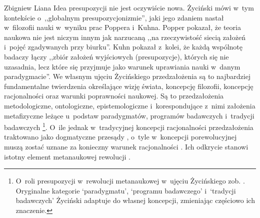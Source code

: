 \begin{artplenv}{Zbigniew Liana}
Idea presupozycji nie jest oczywiście nowa. Życiński
\parencite*[][s.~311n]{zycinski_granice_1993} %
 mówi w~tym kontekście o~,,globalnym presupozycjonizmie'', jaki jego zdaniem nastał w~filozofii nauki w~wyniku prac Poppera i~Kuhna. Popper pokazał, że teoria naukowa nie jest niczym innym jak narzucaną ,,na rzeczywistość siecią założeń i~pojęć zgadywanych przy biurku''. Kuhn pokazał z~kolei, że każdą wspólnotę badaczy łączy ,,zbiór założeń wyjściowych (presupozycje), których się nie uzasadnia, lecz które się przyjmuje jako warunek uprawiania nauki w~danym paradygmacie''. We własnym ujęciu Życińskiego przedzałożenia są to najbardziej fundamentalne twierdzenia określające wizję świata, koncepcję filozofii, koncepcję racjonalności oraz warunki poprawności naukowej. Są to przedzałożenia metodologiczne, ontologiczne, epistemologiczne i~korespondujące z~nimi założenia metafizyczne leżące u~podstaw paradygmatów, programów badawczych i~tradycji badawczych 
\parencites[][s.~7.133]{zycinski_teizm_1985}[][s.~21n.143]{zycinski_structure_1988}[][s.~37nn.253]{zycinski_struktura_2013_liana}%
\footnote{O~roli presupozycji w~rewolucji metanaukowej w~ujęciu Życińskiego zob. 
\parencite[][s.~173–177]{liana_nauka_2019_liana}. %
 Oryginalne kategorie ‘paradygmatu', ‘programu badawczego' i~‘tradycji badawczych' Życiński adaptuje do własnej koncepcji, zmieniając częściowo ich znaczenie.}. O~ile jednak w~tradycyjnej koncepcji racjonalności przedzałożenia traktowano jako dogmatyczne przesądy 
\parencite[][s.~169n]{zycinski_teizm_1985}, %
 o~tyle w~koncepcji porewolucyjnej muszą zostać uznane za konieczny warunek racjonalności 
\parencite[][s.~129.157.172n]{zycinski_teizm_1985}. %
 Ich odkrycie stanowi istotny element metanaukowej rewolucji 
\parencites[][s.~143]{zycinski_structure_1988}[][s.~253]{zycinski_struktura_2013_liana}.%



\end{artplenv}
